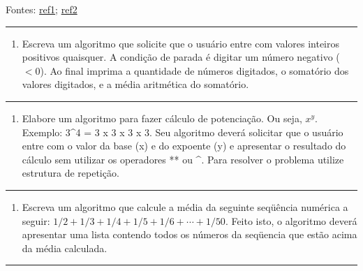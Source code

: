 \documentclass[12pt,a4paper]{article}
\providecommand{\tightlist}{%
      \setlength{\itemsep}{0pt}\setlength{\parskip}{0pt}}
\begin{document}
Fontes:
\href{https://docente.ifrn.edu.br/jonathanpereira/disciplinas/algoritmos/estruturas-de-repeticao/view}{ref1};
\href{https://www.inf.pucrs.br/~pinho/LaproI/Exercicios/Repeticao/Lista1.htm}{ref2}

    \begin{center}\rule{0.5\linewidth}{0.5pt}\end{center}

\begin{enumerate}
\def\labelenumi{\arabic{enumi}.}
\tightlist
\item
  Escreva um algoritmo que solicite que o usuário entre com valores
  inteiros positivos quaisquer. A condição de parada é digitar um número
  negativo (\(<0\)). Ao final imprima a quantidade de números digitados,
  o somatório dos valores digitados, e a média aritmética do somatório.
\end{enumerate}

    \begin{center}\rule{0.5\linewidth}{0.5pt}\end{center}

\begin{enumerate}
\def\labelenumi{\arabic{enumi}.}
\setcounter{enumi}{1}
\tightlist
\item
  Elabore um algoritmo para fazer cálculo de potenciação. Ou seja,
  \(x^y\). Exemplo: 3\^{}4 = 3 x 3 x 3 x 3. Seu algoritmo deverá
  solicitar que o usuário entre com o valor da base (x) e do expoente
  (y) e apresentar o resultado do cálculo sem utilizar os operadores **
  ou \^{}. Para resolver o problema utilize estrutura de repetição.
\end{enumerate}

    \begin{center}\rule{0.5\linewidth}{0.5pt}\end{center}

\begin{enumerate}
\def\labelenumi{\arabic{enumi}.}
\setcounter{enumi}{2}
\tightlist
\item
  Escreva um algoritmo que calcule a média da seguinte seqüência
  numérica a seguir: \(1/2 + 1/3 + 1/4 + 1/5 + 1/6 + \cdots + 1/50\).
  Feito isto, o algoritmo deverá apresentar uma lista contendo todos os
  números da seqüencia que estão acima da média calculada.
\end{enumerate}

    \begin{center}\rule{0.5\linewidth}{0.5pt}\end{center}
\end{document}
